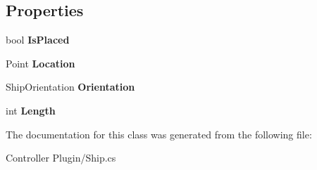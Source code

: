 \subsection*{Properties}
\begin{DoxyCompactItemize}
\item 
\hypertarget{class_m_b_c_1_1_core_1_1_ship_a9a7f4e721f2d4cd9391e2bc633d3ceb2}{bool {\bfseries Is\-Placed}}\label{class_m_b_c_1_1_core_1_1_ship_a9a7f4e721f2d4cd9391e2bc633d3ceb2}

\item 
\hypertarget{class_m_b_c_1_1_core_1_1_ship_ac2b6713dd5e22c092ec5f772379d1c78}{Point {\bfseries Location}}\label{class_m_b_c_1_1_core_1_1_ship_ac2b6713dd5e22c092ec5f772379d1c78}

\item 
\hypertarget{class_m_b_c_1_1_core_1_1_ship_afcd2ca11e40556c99330a4aa0821244a}{Ship\-Orientation {\bfseries Orientation}}\label{class_m_b_c_1_1_core_1_1_ship_afcd2ca11e40556c99330a4aa0821244a}

\item 
\hypertarget{class_m_b_c_1_1_core_1_1_ship_a032a96397bef51321cec9d2ec370ffca}{int {\bfseries Length}}\label{class_m_b_c_1_1_core_1_1_ship_a032a96397bef51321cec9d2ec370ffca}

\end{DoxyCompactItemize}


The documentation for this class was generated from the following file\-:\begin{DoxyCompactItemize}
\item 
Controller Plugin/Ship.\-cs\end{DoxyCompactItemize}
